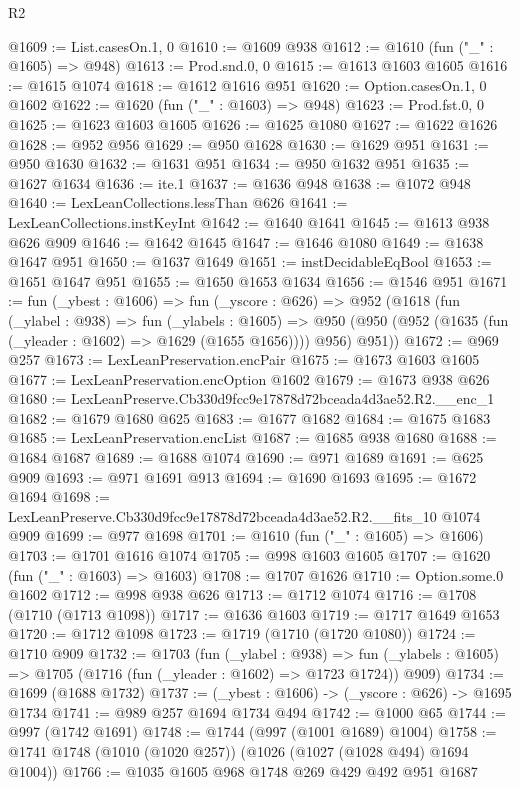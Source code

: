 \begin{lexlean}{R2}
\begin{coremodule}
@1609 := List.casesOn.{1, 0}
@1610 := @1609 @938
@1612 := @1610 (fun ("_" : @1605) => @948)
@1613 := Prod.snd.{0, 0}
@1615 := @1613 @1603 @1605
@1616 := @1615 @1074
@1618 := @1612 @1616 @951
@1620 := Option.casesOn.{1, 0} @1602
@1622 := @1620 (fun ("_" : @1603) => @948)
@1623 := Prod.fst.{0, 0}
@1625 := @1623 @1603 @1605
@1626 := @1625 @1080
@1627 := @1622 @1626
@1628 := @952 @956
@1629 := @950 @1628
@1630 := @1629 @951
@1631 := @950 @1630
@1632 := @1631 @951
@1634 := @950 @1632 @951
@1635 := @1627 @1634
@1636 := ite.{1}
@1637 := @1636 @948
@1638 := @1072 @948
@1640 := LexLeanCollections.lessThan @626
@1641 := LexLeanCollections.instKeyInt
@1642 := @1640 @1641
@1645 := @1613 @938 @626 @909
@1646 := @1642 @1645
@1647 := @1646 @1080
@1649 := @1638 @1647 @951
@1650 := @1637 @1649
@1651 := instDecidableEqBool
@1653 := @1651 @1647 @951
@1655 := @1650 @1653 @1634
@1656 := @1546 @951
@1671 := fun (_ybest : @1606) =>
  fun (_yscore : @626) =>
  @952
    (@1618
      (fun (_ylabel : @938) =>
      fun (_ylabels : @1605) =>
      @950 (@950 (@952 (@1635 (fun (_yleader : @1602) => @1629 (@1655 @1656)))) @956) @951))
@1672 := @969 @257
@1673 := LexLeanPreservation.encPair
@1675 := @1673 @1603 @1605
@1677 := LexLeanPreservation.encOption @1602
@1679 := @1673 @938 @626
@1680 := LexLeanPreserve.Cb330d9fcc9e17878d72bceada4d3ae52.R2.__enc_1
@1682 := @1679 @1680 @625
@1683 := @1677 @1682
@1684 := @1675 @1683
@1685 := LexLeanPreservation.encList
@1687 := @1685 @938 @1680
@1688 := @1684 @1687
@1689 := @1688 @1074
@1690 := @971 @1689
@1691 := @625 @909
@1693 := @971 @1691 @913
@1694 := @1690 @1693
@1695 := @1672 @1694
@1698 := LexLeanPreserve.Cb330d9fcc9e17878d72bceada4d3ae52.R2.__fits_10 @1074 @909
@1699 := @977 @1698
@1701 := @1610 (fun ("_" : @1605) => @1606)
@1703 := @1701 @1616 @1074
@1705 := @998 @1603 @1605
@1707 := @1620 (fun ("_" : @1603) => @1603)
@1708 := @1707 @1626
@1710 := Option.some.{0} @1602
@1712 := @998 @938 @626
@1713 := @1712 @1074
@1716 := @1708 (@1710 (@1713 @1098))
@1717 := @1636 @1603
@1719 := @1717 @1649 @1653
@1720 := @1712 @1098
@1723 := @1719 (@1710 (@1720 @1080))
@1724 := @1710 @909
@1732 := @1703
    (fun (_ylabel : @938) =>
    fun (_ylabels : @1605) => @1705 (@1716 (fun (_yleader : @1602) => @1723 @1724)) @909)
@1734 := @1699 (@1688 @1732)
@1737 := (_ybest : @1606) -> (_yscore : @626) -> @1695 @1734
@1741 := @989 @257 @1694 @1734 @494
@1742 := @1000 @65
@1744 := @997 (@1742 @1691)
@1748 := @1744 (@997 (@1001 @1689) @1004)
@1758 := @1741 @1748 (@1010 (@1020 @257)) (@1026 (@1027 (@1028 @494) @1694 @1004))
@1766 := @1035 @1605 @968 @1748 @269 @429 @492 @951 @1687

\end{coremodule}
\end{lexlean}

